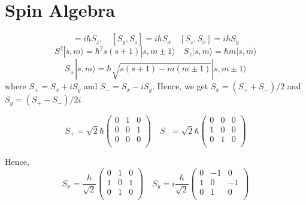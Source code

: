 \documentclass[11pt,a4paper]{article}
\begin{document}
\appendix

\section{Spin Algebra}\label{sec.spin_alegbra}
\begin{equation}
[S_x, S_y]=i \hbar S_z, \quad [S_y, S_z]=i \hbar S_x \quad [S_z, S_x]=i \hbar S_y
\end{equation}
\begin{equation}
S^2|s ,m \rangle = \hbar^2 s(s+1)|s ,m\pm 1\rangle  \quad S_z|s ,m \rangle = \hbar m |s ,m \rangle
\end{equation}
\begin{equation}
S_{\pm}|s, m\rangle = \hbar\sqrt{s(s+1)-m(m \pm 1)}|s,m \pm 1\rangle
\end{equation}
where $S_+ = S_x + iS_y$ and $S_- = S_x - iS_y $. Hence, we get $S_x = (S_+ + S_-)/2$ and $S_y = (S_+ - S_-)/2i $

\begin{equation}
S_+= \sqrt{2} \hbar\begin{pmatrix}
0 & 1 & 0\\
0 & 0 & 1\\
0 & 0 & 0\\
\end{pmatrix}
\quad
S_-=\sqrt{2} \hbar 
\begin{pmatrix}
0 & 0 & 0\\
1 & 0 & 0\\
0 & 1 & 0\\
\end{pmatrix}
\end{equation}

Hence,
\begin{equation}
S_x= \frac{\hbar}{\sqrt{2} }
\begin{pmatrix}
0 & 1 & 0\\
1 & 0 & 1\\
0 & 1 & 0\\
\end{pmatrix} \quad
S_y=  i \frac{\hbar}{\sqrt{2} }
\begin{pmatrix}
0 & -1 & 0\\
1 & 0 & -1\\
0 & 1 & 0\\
\end{pmatrix}
\end{equation}
\end{document}
